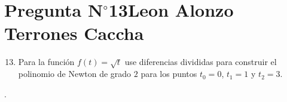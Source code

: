 \section{Pregunta N$^{\circ}$13\qquad Leon Alonzo Terrones Caccha}

\begin{frame}
    \begin{enumerate}\setcounter{enumi}{12}
        \item


              Para la función
              \begin{math}
                  f\left(t\right)=
                  \sqrt{t}
              \end{math}
              use diferencias divididas para construir el polinomio
              de Newton de grado $2$ para los puntos $t_{0}=0$,
              $t_{1}=1$ y $t_{2}=3$.
    \end{enumerate}

    \begin{solution}
        .
    \end{solution}
\end{frame}